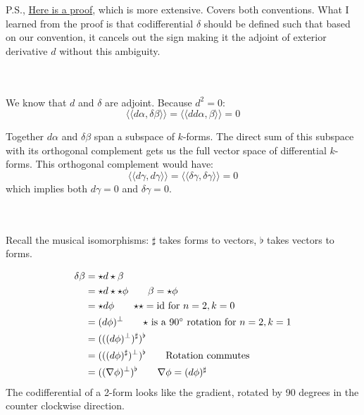 \documentclass{article}
\def\grad{\nabla}
\def\ll{\langle\langle}
\def\rr{\rangle\rangle}
\DeclareMathOperator{\id}{id}
\begin{document}
P.S., \href{https://math.stackexchange.com/a/2829916}{Here is a proof}, which is more extensive. Covers both conventions.
What I learned from the proof is that codifferential $\delta$ should be defined such that based on our convention,
it cancels out the sign making it the adjoint of exterior derivative $d$ without this ambiguity.


\vspace{1.8cm}
\\\\


We know that $d$ and $\delta$ are adjoint. Because $d^2 = 0$:
$$
    \ll d\alpha, \delta\beta \rr = \ll dd\alpha, \beta \rr = 0
$$

Together $d\alpha$ and $\delta\beta$ span a subspace of $k$-forms. The direct sum of this subspace with its orthogonal complement
gets us the full vector space of differential $k$-forms. This orthogonal complement would have:
$$
    \ll d\gamma, d\gamma \rr = \ll \delta\gamma, \delta\gamma \rr = 0
$$
which implies both $d\gamma = 0$ and $\delta\gamma = 0$.


\vspace{1.8cm}
\\\\


Recall the musical isomorphisms: $\sharp$ takes forms to vectors, $\flat$ takes vectors to forms.

\begin{align*}
    \delta \beta &= \star d\star\beta \\
        &= \star d\star\star\phi \tag*{$\beta = \star\phi$} \\
        &= \star d\phi \tag*{$\star\star = \id$ for $n=2,k=0$} \\
        &= (d\phi)^\perp \tag*{$\star$ is a $90^\circ$ rotation for $n=2,k=1$} \\
        &= (((d\phi)^\perp)^\sharp)^\flat \\
        &= (((d\phi)^\sharp)^\perp)^\flat \tag*{Rotation commutes} \\
        &= ((\grad \phi)^\perp)^\flat \tag*{$\grad \phi = (d\phi)^\sharp$}
\end{align*}
The codifferential of a 2-form looks like the gradient, rotated by 90 degrees in the counter clockwise direction.
\end{document}
